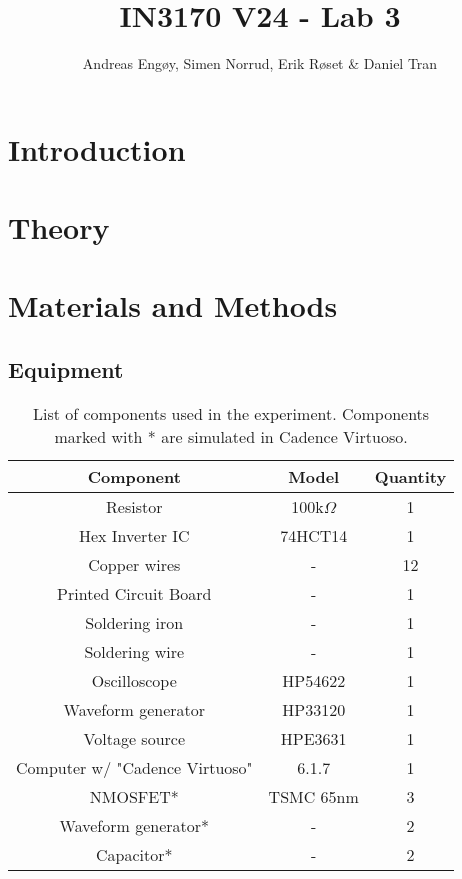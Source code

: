 \documentclass[onecolumn]{article}
\title{IN3170 V24 - Lab 3}
\author{Andreas Engøy, Simen Norrud, Erik Røset \& Daniel Tran}
\date{\monthname[\the\month] \the\year}
\begin{document}
\maketitle
\tableofcontents

\section{Introduction}

\section{Theory}

\subsection{}



\section{Materials and Methods}
\subsection{Equipment}
\begin{table}[h!]
    \centering
    \begin{tabular}{|c|c|c|}
        \hline
        \textbf{Component} & \textbf{Model} & \textbf{Quantity} \\
        \hline
        Resistor & 100k$\Omega$ & 1 \\
        Hex Inverter IC & 74HCT14 & 1 \\
        Copper wires & - & 12 \\
        Printed Circuit Board & - & 1 \\
        Soldering iron & - & 1 \\
        Soldering wire & - & 1 \\
        Oscilloscope & HP54622 & 1 \\
        Waveform generator  & HP33120 & 1 \\
        Voltage source & HPE3631 & 1 \\
        Computer w/ "Cadence Virtuoso" & 6.1.7 & 1 \\
        NMOSFET* & TSMC 65nm & 3 \\
        Waveform generator* & - & 2 \\ 
        Capacitor* & - & 2 \\
        \hline
    \end{tabular}
    \caption{List of components used in the experiment. Components marked with * are simulated in Cadence Virtuoso.}
    \label{tab:bom}
\end{table}
\end{document}
